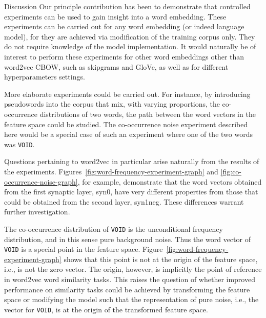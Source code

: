 \documentclass{article} %
\newcommand{\word}[1]{\texttt{#1}}
\begin{document}
\begin{section}{Discussion}\label{future-directions}
Our principle contribution has been to demonstrate that controlled
experiments can be used to gain insight into a word embedding.  These
experiments can be carried out for any word embedding (or indeed
language model), for they are achieved via modification of the training
corpus only.  They do not require knowledge of the model implementation.
It would naturally be of interest to perform these experiments for other
word embeddings other than word2vec CBOW, such as skipgrams and GloVe,
as well as for different hyperparameters settings.

More elaborate experiments could be carried out.  For instance, by
introducing pseudowords into the corpus that mix, with varying proportions,
the co-occurrence distributions of two words, the path between the word
vectors in the feature space could be studied.  The co-occurrence noise
experiment described here would be a special case of such an
experiment where one of the two words was \word{VOID}.

Questions pertaining to word2vec in particular arise naturally from the
results of the experiments.
Figures~\ref{fig:word-frequency-experiment-graph} and
\ref{fig:co-occurrence-noise-graph}, for example, demonstrate that the
word vectors obtained from the first synaptic layer, syn0, have very
different properties from those that could be obtained from the second
layer, syn1neg.  These differences warrant further investigation.

The co-occurrence distribution of \word{VOID} is the unconditional
frequency distribution, and in this sense pure background noise.  Thus
the word vector of \word{VOID} is a special point in the feature space.
Figure~\ref{fig:word-frequency-experiment-graph} shows that this point
is not at the origin of the feature space, i.e., is not the zero vector.
The origin, however, is implicitly the point of reference in word2vec
word similarity tasks.  This raises the question of whether improved
performance on similarity tasks could be achieved by transforming the
feature space or modifying the model such that the representation of
pure noise, i.e., the vector for \word{VOID}, is at the origin of the
transformed feature space.



\end{section}

\clearpage
\footnotesize


\end{document}
